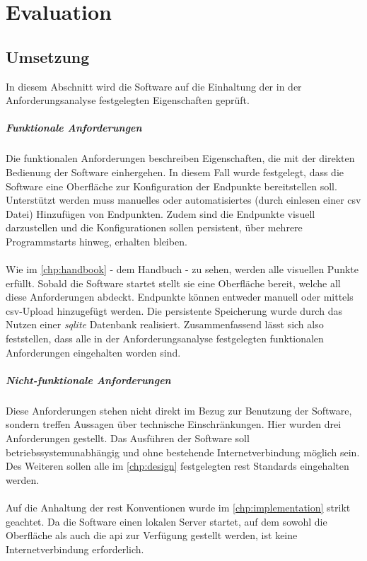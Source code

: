 \chapter{Evaluation} \label{chp:conclusion}

\section{Umsetzung} \label{sec:implementation}

In diesem Abschnitt wird die Software auf die Einhaltung der in der Anforderungsanalyse festgelegten Eigenschaften geprüft. 

\paragraph{Funktionale Anforderungen}

Die funktionalen Anforderungen beschreiben Eigenschaften, die mit der direkten Bedienung der Software einhergehen. In diesem Fall wurde festgelegt, dass die Software eine Oberfläche zur Konfiguration der Endpunkte bereitstellen soll. Unterstützt werden muss manuelles oder automatisiertes (durch einlesen einer \gls{csv} Datei) Hinzufügen von Endpunkten. \cite{Sommerville.2016} Zudem sind die Endpunkte visuell darzustellen und die Konfigurationen sollen persistent, über mehrere Programmstarts hinweg, erhalten bleiben.
\\ \\
Wie im \autoref{chp:handbook} - dem Handbuch - zu sehen, werden alle visuellen Punkte erfüllt. Sobald die Software startet stellt sie eine Oberfläche bereit, welche all diese Anforderungen abdeckt. Endpunkte können entweder manuell oder mittels \gls{csv}-Upload hinzugefügt werden. 
Die persistente Speicherung wurde durch das Nutzen einer \textit{sqlite} Datenbank realisiert. 
Zusammenfassend lässt sich also feststellen, dass alle in der Anforderungsanalyse festgelegten funktionalen Anforderungen eingehalten worden sind.

\paragraph{Nicht-funktionale Anforderungen}

Diese Anforderungen stehen nicht direkt im Bezug zur Benutzung der Software, sondern treffen Aussagen über technische Einschränkungen. Hier wurden drei Anforderungen gestellt. Das Ausführen der Software soll betriebssystemunabhängig und ohne bestehende Internetverbindung möglich sein. Des Weiteren sollen alle im \autoref{chp:design} festgelegten \gls{rest} Standards eingehalten werden. 
\\ \\
Auf die Anhaltung der \gls{rest} Konventionen wurde im \autoref{chp:implementation} strikt geachtet. Da die Software einen lokalen Server startet, auf dem sowohl die Oberfläche als auch die \gls{api} zur Verfügung gestellt werden, ist keine Internetverbindung erforderlich.


